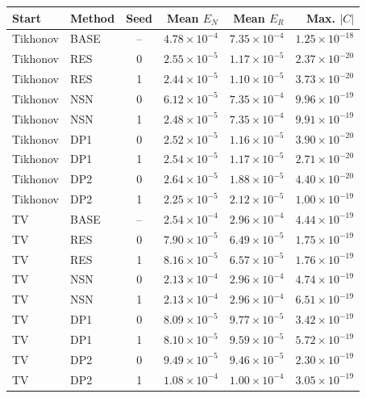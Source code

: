 \begingroup\small\setlength{\tabcolsep}{4pt}\renewcommand{\arraystretch}{1.1}
\begin{tabular}{@{}llcrrr@{}}
\toprule
Start & Method & Seed & Mean $E_N$ & Mean $E_R$ & Max. $|C|$ \\ \midrule
Tikhonov & BASE & -- & $4.78\times10^{-4}$ & $7.35\times10^{-4}$ & $1.25\times10^{-18}$ \\
Tikhonov & RES & 0 & $2.55\times10^{-5}$ & $1.17\times10^{-5}$ & $2.37\times10^{-20}$ \\
Tikhonov & RES & 1 & $2.44\times10^{-5}$ & $1.10\times10^{-5}$ & $3.73\times10^{-20}$ \\
Tikhonov & NSN & 0 & $6.12\times10^{-5}$ & $7.35\times10^{-4}$ & $9.96\times10^{-19}$ \\
Tikhonov & NSN & 1 & $2.48\times10^{-5}$ & $7.35\times10^{-4}$ & $9.91\times10^{-19}$ \\
Tikhonov & DP1 & 0 & $2.52\times10^{-5}$ & $1.16\times10^{-5}$ & $3.90\times10^{-20}$ \\
Tikhonov & DP1 & 1 & $2.54\times10^{-5}$ & $1.17\times10^{-5}$ & $2.71\times10^{-20}$ \\
Tikhonov & DP2 & 0 & $2.64\times10^{-5}$ & $1.88\times10^{-5}$ & $4.40\times10^{-20}$ \\
Tikhonov & DP2 & 1 & $2.25\times10^{-5}$ & $2.12\times10^{-5}$ & $1.00\times10^{-19}$ \\
TV & BASE & -- & $2.54\times10^{-4}$ & $2.96\times10^{-4}$ & $4.44\times10^{-19}$ \\
TV & RES & 0 & $7.90\times10^{-5}$ & $6.49\times10^{-5}$ & $1.75\times10^{-19}$ \\
TV & RES & 1 & $8.16\times10^{-5}$ & $6.57\times10^{-5}$ & $1.76\times10^{-19}$ \\
TV & NSN & 0 & $2.13\times10^{-4}$ & $2.96\times10^{-4}$ & $4.74\times10^{-19}$ \\
TV & NSN & 1 & $2.13\times10^{-4}$ & $2.96\times10^{-4}$ & $6.51\times10^{-19}$ \\
TV & DP1 & 0 & $8.09\times10^{-5}$ & $9.77\times10^{-5}$ & $3.42\times10^{-19}$ \\
TV & DP1 & 1 & $8.10\times10^{-5}$ & $9.59\times10^{-5}$ & $5.72\times10^{-19}$ \\
TV & DP2 & 0 & $9.49\times10^{-5}$ & $9.46\times10^{-5}$ & $2.30\times10^{-19}$ \\
TV & DP2 & 1 & $1.08\times10^{-4}$ & $1.00\times10^{-4}$ & $3.05\times10^{-19}$ \\
\bottomrule
\end{tabular}\endgroup
